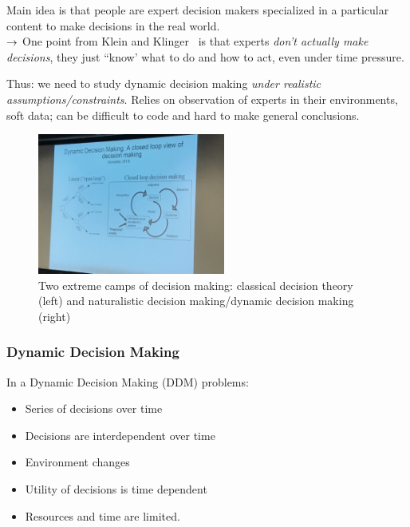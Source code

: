 
Main idea is that people are expert decision makers specialized in a particular content to make decisions in the real world. \\

$\rightarrow$ One point from Klein and Klinger~\cite{salas2001linking} is that experts {\it don't actually make decisions}, they just ``know' what to do and how to act, even under time pressure.

Thus: we need to study dynamic decision making {\it under realistic assumptions/constraints}. Relies on observation of experts in their environments, soft data; can be difficult to code and hard to make general conclusions.

\begin{figure}
    \centering
    \includegraphics[width=0.55\textwidth]{images/ddm.JPG}
    \caption{Two extreme camps of decision making: classical decision theory (left) and naturalistic decision making/dynamic decision making (right)}
    \label{fig:ddm}
\end{figure}

\subsubsection{Dynamic Decision Making}

In a Dynamic Decision Making (DDM) problems:
\begin{itemize}
    \item Series of decisions over time
    \item Decisions are interdependent over time
    \item Environment changes
    \item Utility of decisions is time dependent
    \item Resources and time are limited.
\end{itemize}

